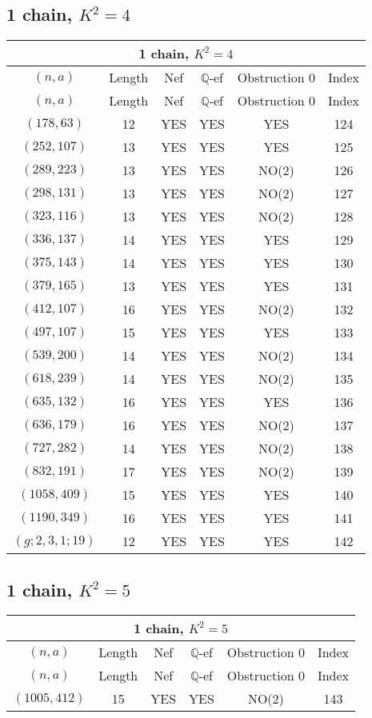 \subsection{1 chain, $K^2 = 4$}
\begin{longtable}{|c|c|c|c|c|c|}
\hline
\multicolumn{6}{|c|}{1 chain, $K^2 = 4$}\\
\hline
$(n,a)$ & Length & Nef & $\mathbb Q$-ef & Obstruction 0 & Index\\
\hline
\endfirsthead

\hline
$(n,a)$ & Length & Nef & $\mathbb Q$-ef & Obstruction 0 & Index\\
\hline
\endhead
\hline
\endfoot

$(178, 63)$ & 12 & YES & YES & YES & 124\\
$(252, 107)$ & 13 & YES & YES & YES & 125\\
$(289, 223)$ & 13 & YES & YES & NO(2) & 126\\
$(298, 131)$ & 13 & YES & YES & NO(2) & 127\\
$(323, 116)$ & 13 & YES & YES & NO(2) & 128\\
$(336, 137)$ & 14 & YES & YES & YES & 129\\
$(375, 143)$ & 14 & YES & YES & YES & 130\\
$(379, 165)$ & 13 & YES & YES & YES & 131\\
$(412, 107)$ & 16 & YES & YES & NO(2) & 132\\
$(497, 107)$ & 15 & YES & YES & YES & 133\\
$(539, 200)$ & 14 & YES & YES & NO(2) & 134\\
$(618, 239)$ & 14 & YES & YES & NO(2) & 135\\
$(635, 132)$ & 16 & YES & YES & YES & 136\\
$(636, 179)$ & 16 & YES & YES & NO(2) & 137\\
$(727, 282)$ & 14 & YES & YES & NO(2) & 138\\
$(832, 191)$ & 17 & YES & YES & NO(2) & 139\\
$(1058, 409)$ & 15 & YES & YES & YES & 140\\
$(1190, 349)$ & 16 & YES & YES & YES & 141\\
$(g; 2, 3, 1; 19)$ & 12 & YES & YES & YES & 142
\end{longtable}
\subsection{1 chain, $K^2 = 5$}
\begin{longtable}{|c|c|c|c|c|c|}
\hline
\multicolumn{6}{|c|}{1 chain, $K^2 = 5$}\\
\hline
$(n,a)$ & Length & Nef & $\mathbb Q$-ef & Obstruction 0 & Index\\
\hline
\endfirsthead

\hline
$(n,a)$ & Length & Nef & $\mathbb Q$-ef & Obstruction 0 & Index\\
\hline
\endhead
\hline
\endfoot

$(1005, 412)$ & 15 & YES & YES & NO(2) & 143
\end{longtable}
